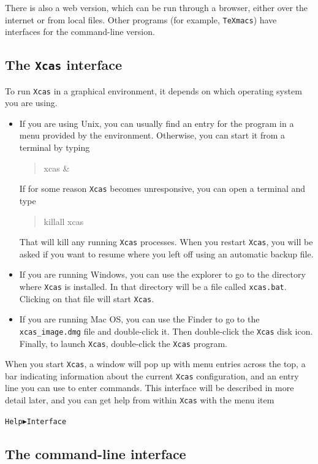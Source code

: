 \documentclass[a4paper,11pt]{book}
\newenvironment{giaccmd}
{\begin{quote}\ttfamily}
{\end{quote}}
\begin{document}
There is also a web version, which can be run through a browser,
either over the internet or from local files.  Other programs (for
example, \texttt{TeXmacs}) have interfaces for the command-line
version.

\subsection{The \texttt{Xcas} interface}

To run \texttt{Xcas} in a graphical environment, it depends on which
operating system you are using.
\begin{itemize}
  \item
If you are using Unix, you can usually find
an entry for the program in a menu provided by the environment.
Otherwise, you can start it from a terminal by typing
\begin{giaccmd}
  xcas \&
\end{giaccmd}
If for some reason \texttt{Xcas} becomes unresponsive, you can open a
terminal and type
\begin{giaccmd}
  killall xcas
\end{giaccmd}
That will kill any running \texttt{Xcas} processes.  When you restart
\texttt{Xcas}, you will be asked if you want to resume where you left
off using an automatic backup file.
\item
If you are running Windows, you can use the explorer to go to the
directory where \texttt{Xcas} is installed.  In that directory will be
a file called \texttt{xcas.bat}.  Clicking on that file will start
\texttt{Xcas}.
\item
If you are running Mac OS, you can use the Finder to go to the
\texttt{xcas\_image.dmg} file and double-click it.  Then double-click
the \texttt{Xcas} disk icon.  Finally, to launch \texttt{Xcas},
double-click the \texttt{Xcas} program.
\end{itemize}
When you start \texttt{Xcas}, a
window will pop up with menu entries across the top, a bar
indicating information about the current \texttt{Xcas} configuration,
and an entry line you can use to enter commands.  This interface will
be described in more detail later, and you can get help
from within \texttt{Xcas} with the menu item
\begin{center}
\texttt{Help$\blacktriangleright$Interface}
\end{center}

\subsection{The command-line interface}
\end{document}
